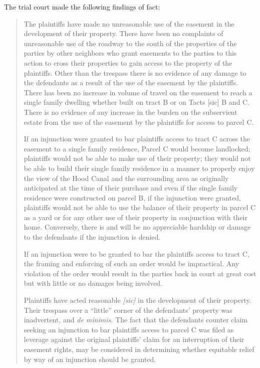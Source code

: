 The trial court made the following findings of fact:

\begin{quotation}

The plaintiffs have made no unreasonable use of the easement in the development
of their property. There have been no complaints of unreasonable use of the
roadway to the south of the properties of the parties by other neighbors who
grant easements to the parties to this action to cross their properties to gain
access to the property of the plaintiffs. Other than the trespass there is no
evidence of any damage to the defendants as a result of the use of the easement
by the plaintiffs. There has been no increase in volume of travel on the
easement to reach a single family dwelling whether built on tract B or on Tacts
[sic] B and C. There is no evidence of any increase in the burden on the
subservient estate from the use of the easement by the plaintiffs for access to
parcel C.


If an injunction were granted to bar plaintiffs access to tract C across the
easement to a single family residence, Parcel C would become landlocked;
plaintiffs would not be able to make use of their property; they would not be
able to build their single family residence in a manner to properly enjoy the
view of the Hood Canal and the surrounding area as originally anticipated at the
time of their purchase and even if the single family residence were constructed
on parcel B, if the injunction were granted, plaintiffs would not be able to use
the balance of their property in parcel C as a yard or for any other use of
their property in conjunction with their home. Conversely, there is and will be
no appreciable hardship or damage to the defendants if the injunction is
denied.


If an injunction were to be granted to bar the plaintiffs access to tract C, the
framing and enforcing of such an order would be impractical. Any violation of
the order would result in the parties back in court at great cost but with
little or no damages being involved.


Plaintiffs have acted reasonable \textit{[sic]} in the development of their
property. Their trespass over a ``little'' corner of the defendants' property
was inadvertent, and \textit{de minimis.} The fact that the defendants counter
claim seeking an injunction to bar plaintiffs access to parcel C was filed as
leverage against the original plaintiffs' claim for an interruption of their
easement rights, may be considered in determining whether equitable relief by
way of an injunction should be granted.
\end{quotation}

